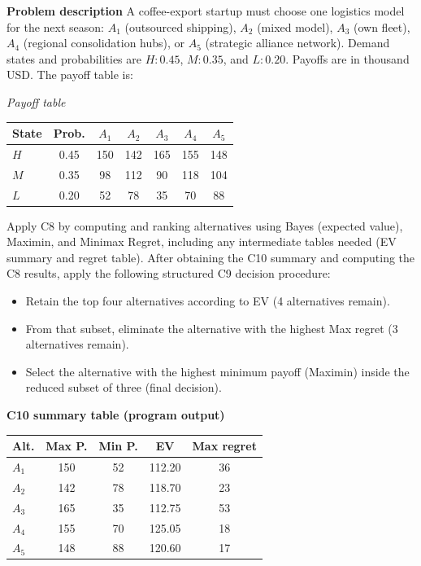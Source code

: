 	\begin{ExamProblems}

		\item
		\textbf{Problem description}
		A coffee-export startup must choose one logistics model for the next season: $A_1$ (outsourced shipping), $A_2$ (mixed model), $A_3$ (own fleet), $A_4$ (regional consolidation hubs), or $A_5$ (strategic alliance network).
		Demand states and probabilities are $H:0.45$, $M:0.35$, and $L:0.20$. Payoffs are in thousand USD. The payoff table is:
		
		\begin{center}
			\textit{Payoff table} \\
			\begin{tabular}{l c c c c c c}
				\hline
				State& Prob. & $A_1$ & $A_2$ & $A_3$ & $A_4$ & $A_5$ \\
				\hline
				$H$ & 0.45 & 150 & 142 & 165 & 155 & 148 \\
				$M$ & 0.35 & 98 & 112 & 90 & 118 & 104 \\
				$L$ & 0.20 & 52 & 78 & 35 & 70 & 88 \\
				\hline
			\end{tabular}
		\end{center}
		
		Apply C8 by computing and ranking alternatives using Bayes (expected value), Maximin, and Minimax Regret, including any intermediate tables needed (EV summary and regret table).
		After obtaining the C10 summary and computing the C8 results, apply the following structured C9 decision procedure:
		\begin{itemize}
			\item Retain the top four alternatives according to EV (4 alternatives remain).
			\item From that subset, eliminate the alternative with the highest Max regret (3 alternatives remain).
			\item Select the alternative with the highest minimum payoff (Maximin) inside the reduced subset of three (final decision).
		\end{itemize}
		
		\vspace{0.25cm}
		
		\textbf{C10 summary table (program output)}\par
		\begin{center}
			\begin{tabular}{l c c c c}
				\hline
				Alt. & Max P. & Min P. & EV & Max regret \\
				\hline
				$A_1$ & 150 & 52 & 112.20 & 36 \\
				$A_2$ & 142 & 78 & 118.70 & 23 \\
				$A_3$ & 165 & 35 & 112.75 & 53 \\
				$A_4$ & 155 & 70 & 125.05 & 18 \\
				$A_5$ & 148 & 88 & 120.60 & 17 \\
				\hline
			\end{tabular}
		\end{center}
		

\end{ExamProblems}
